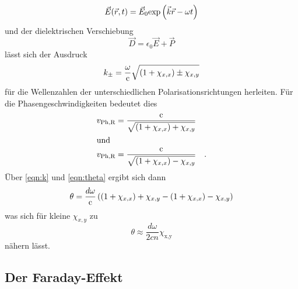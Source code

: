 \begin{equation*}
    \vec{E}(\vec{r},t) = \vec{E}_0 \text{exp}\left(\vec k \vec r - \omega t\right)
\end{equation*}
und der dielektrischen Verschiebung
\begin{equation*}
    \vec D = \epsilon_0 \vec E + \vec P 
\end{equation*}
lässt sich der Ausdruck 
\begin{equation}
    k_\pm = \frac{\omega}{\text{c}} \sqrt{ \left(1 + \chi_{x,x}\right) \pm \chi_{x,y}}
    \label{eqn:k}
\end{equation}
für die Wellenzahlen der unterschiedlichen Polarisationsrichtungen herleiten.
Für die Phasengeschwindigkeiten bedeutet dies 
\begin{align*}
    v_{\text{Ph,R}} &= \frac{\text{c}}{\sqrt{ \left(1 + \chi_{x,x}\right) + \chi_{x,y}}}\\
    \intertext{und}
    v_{\text{Ph,R}} &= \frac{\text{c}}{\sqrt{ \left(1 + \chi_{x,x}\right) - \chi_{x,y}}} \quad .
\end{align*}
Über \autoref{eqn:k} und \autoref{eqn:theta} ergibt sich dann
\begin{equation*}
    \theta = \frac{d \omega}{\text{c}} \left(\left(1 + \chi_{x,x}\right) + \chi_{x,y} - \left(1 + \chi_{x,x}\right) - \chi_{x,y} \right)
\end{equation*}
was sich für kleine $\chi_{x,y}$ zu
\begin{equation*}
    \theta \approx \frac{d\omega}{2cn}\chi_\text{x,y}
\end{equation*}
nähern lässt.


\subsection{Der Faraday-Effekt}
  

